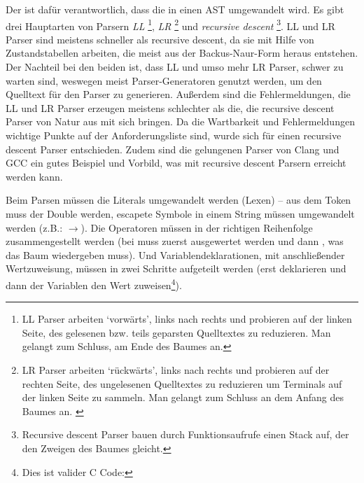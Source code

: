       Der  ist dafür verantwortlich, dass die  in einen AST umgewandelt wird. Es gibt drei Hauptarten von Parsern\autocite[S.77\,f.]{eirund2013formale}
      \emph{LL} %
      \footnote{
        LL Parser arbeiten `vorwärts', links nach rechts und probieren auf der linken Seite, des gelesenen bzw. teils geparsten Quelltextes zu reduzieren. Man gelangt zum Schluss, am Ende des Baumes an.
      },
      \emph{LR} %
      \footnote{
        LR Parser arbeiten `rückwärts', links nach rechts und probieren auf der rechten Seite, des ungelesenen Quelltextes zu reduzieren um Terminals auf der linken Seite zu sammeln. Man gelangt zum Schluss an dem Anfang des Baumes an. \autocite{cs143-stanford}
      } und
      \emph{recursive descent} %
      \footnote{
        Recursive descent Parser bauen durch Funktionsaufrufe einen Stack auf, der den Zweigen des Baumes gleicht.
      }.
      LL und LR Parser sind meistens schneller als recursive descent, da sie mit Hilfe von Zustandstabellen arbeiten, die meist aus der Backus-Naur-Form heraus entstehen. Der Nachteil bei den beiden ist, dass LL und umso mehr LR Parser, schwer zu warten sind, weswegen meist Parser-Generatoren genutzt werden, um den Quelltext für den Parser zu generieren. Außerdem sind die Fehlermeldungen, die LL und LR Parser erzeugen meistens schlechter als die, die recursive descent Parser von Natur aus mit sich bringen\autocite{scott2010gll}. Da die Wartbarkeit und Fehlermeldungen wichtige Punkte auf der Anforderungsliste sind, wurde sich für einen recursive descent Parser entschieden. Zudem sind die gelungenen Parser von Clang\autocite{clang-feat} und GCC\autocite{gcc-new-parser} ein gutes Beispiel und Vorbild, was mit recursive descent Parsern erreicht werden kann.

      Beim Parsen müssen die Literals umgewandelt  werden (Lexen) -- aus dem Token  muss der Double  werden, escapete Symbole in einem String müssen umgewandelt werden (z.B.: $\rightarrow$).
      Die Operatoren müssen in der richtigen Reihenfolge zusammengestellt werden %
      (bei
       muss  zuerst ausgewertet werden und dann , was das Baum wiedergeben muss). Und Variablendeklarationen, mit anschließender Wertzuweisung, müssen in zwei Schritte aufgeteilt werden (erst deklarieren und dann der Variablen den Wert zuweisen\footnote{
        Dies ist valider C Code: 
      }).


